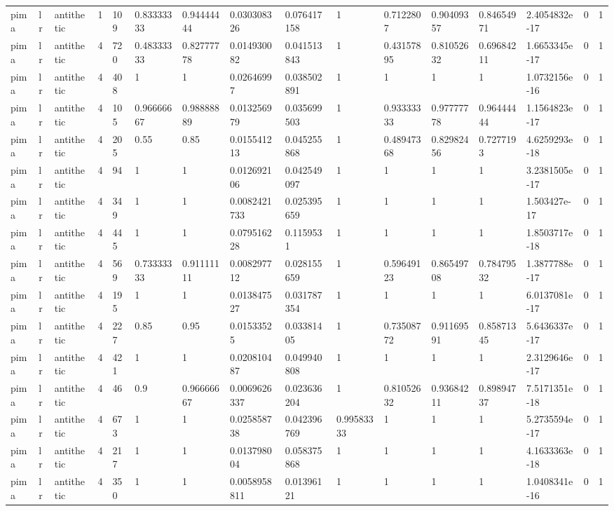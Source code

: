 \begin{tabular}{llllllllllllllll}
pima & lr & antithetic & 1 & 109 & 0.83333333 & 0.94444444 & 0.030308326 & 0.076417158 & 1 & 0.7122807 & 0.90409357 & 0.84654971 & 2.4054832e-17 & 0 & 1 \\
pima & lr & antithetic & 4 & 720 & 0.48333333 & 0.82777778 & 0.014930082 & 0.041513843 & 1 & 0.43157895 & 0.81052632 & 0.69684211 & 1.6653345e-17 & 0 & 1 \\
pima & lr & antithetic & 4 & 408 & 1 & 1 & 0.02646997 & 0.038502891 & 1 & 1 & 1 & 1 & 1.0732156e-16 & 0 & 1 \\
pima & lr & antithetic & 4 & 105 & 0.96666667 & 0.98888889 & 0.013256979 & 0.035699503 & 1 & 0.93333333 & 0.97777778 & 0.96444444 & 1.1564823e-17 & 0 & 1 \\
pima & lr & antithetic & 4 & 205 & 0.55 & 0.85 & 0.015541213 & 0.045255868 & 1 & 0.48947368 & 0.82982456 & 0.7277193 & 4.6259293e-18 & 0 & 1 \\
pima & lr & antithetic & 4 & 94 & 1 & 1 & 0.012692106 & 0.042549097 & 1 & 1 & 1 & 1 & 3.2381505e-17 & 0 & 1 \\
pima & lr & antithetic & 4 & 349 & 1 & 1 & 0.0082421733 & 0.025395659 & 1 & 1 & 1 & 1 & 1.503427e-17 & 0 & 1 \\
pima & lr & antithetic & 4 & 445 & 1 & 1 & 0.079516228 & 0.1159531 & 1 & 1 & 1 & 1 & 1.8503717e-18 & 0 & 1 \\
pima & lr & antithetic & 4 & 569 & 0.73333333 & 0.91111111 & 0.008297712 & 0.028155659 & 1 & 0.59649123 & 0.86549708 & 0.78479532 & 1.3877788e-17 & 0 & 1 \\
pima & lr & antithetic & 4 & 195 & 1 & 1 & 0.013847527 & 0.031787354 & 1 & 1 & 1 & 1 & 6.0137081e-17 & 0 & 1 \\
pima & lr & antithetic & 4 & 227 & 0.85 & 0.95 & 0.01533525 & 0.03381405 & 1 & 0.73508772 & 0.91169591 & 0.85871345 & 5.6436337e-17 & 0 & 1 \\
pima & lr & antithetic & 4 & 421 & 1 & 1 & 0.020810487 & 0.049940808 & 1 & 1 & 1 & 1 & 2.3129646e-17 & 0 & 1 \\
pima & lr & antithetic & 4 & 46 & 0.9 & 0.96666667 & 0.0069626337 & 0.023636204 & 1 & 0.81052632 & 0.93684211 & 0.89894737 & 7.5171351e-18 & 0 & 1 \\
pima & lr & antithetic & 4 & 673 & 1 & 1 & 0.025858738 & 0.042396769 & 0.99583333 & 1 & 1 & 1 & 5.2735594e-17 & 0 & 1 \\
pima & lr & antithetic & 4 & 217 & 1 & 1 & 0.013798004 & 0.058375868 & 1 & 1 & 1 & 1 & 4.1633363e-18 & 0 & 1 \\
pima & lr & antithetic & 4 & 350 & 1 & 1 & 0.0058958811 & 0.01396121 & 1 & 1 & 1 & 1 & 1.0408341e-16 & 0 & 1 \\

\end{tabular}
